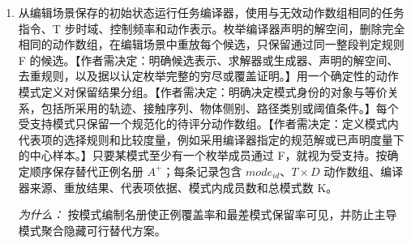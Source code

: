 \documentclass[10pt,a4paper]{article}
\begin{document}
\begin{enumerate}[leftmargin=*,start=1]
\par\emph{为什么：} 该掩码来自观测到的模拟器结构，确定几何编辑首次改变功能有效性的时间区域。
  \item 从编辑场景保存的初始状态运行任务编译器，使用与无效动作数组相同的任务指令、T 步时域、控制频率和动作表示。枚举编译器声明的解空间，删除完全相同的动作数组，在编辑场景中重放每个候选，只保留通过同一整段判定规则 F 的候选。【作者需决定：明确候选表示、求解器或生成器、声明的解空间、去重规则，以及据以认定枚举完整的穷尽或覆盖证明。】用一个确定性的动作模式定义对保留结果分组。【作者需决定：明确决定模式身份的对象与等价关系，包括所采用的轨迹、接触序列、物体侧别、路径类别或阈值条件。】每个受支持模式只保留一个规范化的待评分动作数组。【作者需决定：定义模式内代表项的选择规则和比较度量，例如采用编译器指定的规范解或已声明度量下的中心样本。】只要某模式至少有一个枚举成员通过 F，就视为受支持。按确定顺序保存替代正例名册 \(A^{+}\)；每条记录包含 \(mode_{id}\)、\(T\times D\) 动作数组、编译器来源、重放结果、代表项依据、模式内成员数和总模式数 K。
\par\emph{为什么：} 按模式编制名册使正例覆盖率和最差模式保留率可见，并防止主导模式聚合隐藏可行替代方案。
\end{enumerate}
\end{document}
